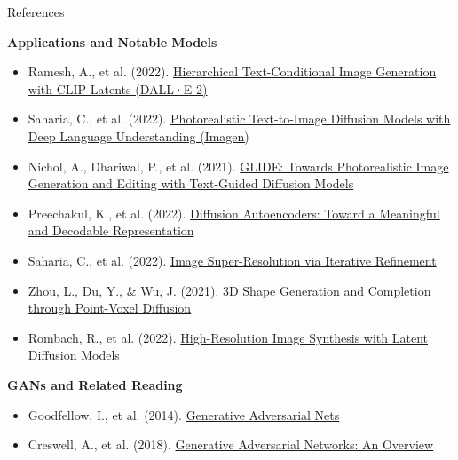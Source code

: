 \begin{frame}[allowframebreaks]{References}
\framebreak

\textbf{Applications and Notable Models}
\begin{itemize}
    \item Ramesh, A., et al. (2022). \href{https://arxiv.org/abs/2204.06125}{Hierarchical Text-Conditional Image Generation with CLIP Latents (DALL·E 2)}
    \item Saharia, C., et al. (2022). \href{https://arxiv.org/abs/2205.11487}{Photorealistic Text-to-Image Diffusion Models with Deep Language Understanding (Imagen)}
    \item Nichol, A., Dhariwal, P., et al. (2021). \href{https://arxiv.org/abs/2112.10741}{GLIDE: Towards Photorealistic Image Generation and Editing with Text-Guided Diffusion Models}
    \item Preechakul, K., et al. (2022). \href{https://arxiv.org/abs/2111.15640}{Diffusion Autoencoders: Toward a Meaningful and Decodable Representation}
    \item Saharia, C., et al. (2022). \href{https://arxiv.org/abs/2104.07636}{Image Super-Resolution via Iterative Refinement}
    \item Zhou, L., Du, Y., \& Wu, J. (2021). \href{https://arxiv.org/abs/2104.03670}{3D Shape Generation and Completion through Point-Voxel Diffusion}
    \item Rombach, R., et al. (2022). \href{https://arxiv.org/abs/2112.10752}{High-Resolution Image Synthesis with Latent Diffusion Models}
\end{itemize}

\framebreak

\textbf{GANs and Related Reading}
\begin{itemize}
    \item Goodfellow, I., et al. (2014). \href{https://arxiv.org/abs/1406.2661}{Generative Adversarial Nets}
    \item Creswell, A., et al. (2018). \href{https://arxiv.org/abs/1710.07035}{Generative Adversarial Networks: An Overview}
\end{itemize}
\end{frame}
